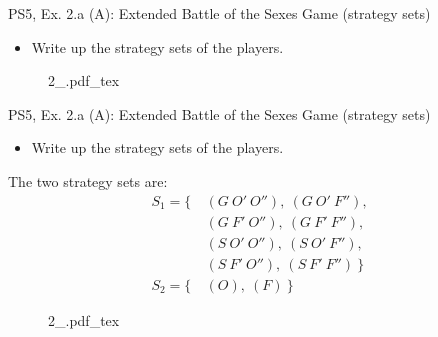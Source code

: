 \begin{frame}{PS5, Ex. 2.a (A): Extended Battle of the Sexes Game (strategy sets)}
  \begin{multicols}{2}
    \begin{itemize}
      \item[(a)] Write up the strategy sets of the players.
    \end{itemize}
    \vfill\null \columnbreak
    \begin{figure}[!h]
      \center
      \def\svgwidth{\columnwidth}
      {2_.pdf_tex}
    \end{figure}
    \vfill\null
  \end{multicols}
\end{frame}
\begin{frame}{PS5, Ex. 2.a (A): Extended Battle of the Sexes Game (strategy sets)}
  \begin{multicols}{2}
    \begin{itemize}
      \item[(a)] Write up the strategy sets of the players.
    \end{itemize}
    The two strategy sets are:
    \begin{align*}
      S_1=\{\ &(G\ O'\ O''),\ (G\ O'\ F''),\\
              &(G\ F'\ O''),\ (G\ F'\ F''),\\
              &(S\ O'\ O''),\ (S\ O'\ F''),\\
              &(S\ F'\ O''),\ (S\ F'\ F'')\ \}\\
      S_2=\{\ &(O),\ (F)\ \}
    \end{align*}
    \vfill\null \columnbreak
    \begin{figure}[!h]
      \center
      \def\svgwidth{\columnwidth}
      {2_.pdf_tex}
    \end{figure}
    \vfill\null
  \end{multicols}
\end{frame}

